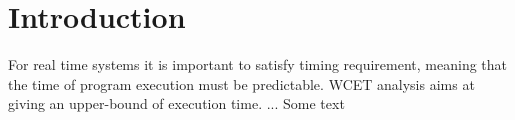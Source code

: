 \chapter{Introduction}

For real time systems it is important to satisfy timing requirement, meaning that the time of program execution must be predictable. WCET analysis aims at giving an upper-bound of execution time. ...
Some text \cite{perais_increasing_2016}

